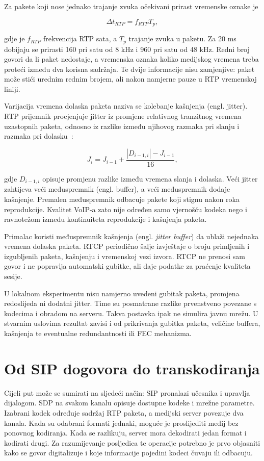 Za pakete koji nose jednako trajanje zvuka očekivani prirast vremenske oznake je

\begin{equation}
\Delta t_{RTP}=f_{RTP}T_p,
\end{equation}

gdje je $f_{RTP}$ frekvencija RTP sata, a $T_p$ trajanje zvuka u paketu. Za 20 ms dobijaju se prirasti 160 pri satu od 8 kHz i 960 pri satu od 48 kHz. Redni broj govori da li paket nedostaje, a vremenska oznaka koliko medijskog vremena treba proteći između dva korisna sadržaja. Te dvije informacije nisu zamjenjive: paket može stići urednim rednim brojem, ali nakon namjerne pauze u RTP vremenskoj liniji.

Varijacija vremena dolaska paketa naziva se kolebanje kašnjenja (engl. jitter). RTP prijemnik procjenjuje jitter iz promjene relativnog tranzitnog vremena uzastopnih paketa, odnosno iz razlike između njihovog razmaka pri slanju i razmaka pri dolasku~\cite{rfc3550}:

\begin{equation}
J_i=J_{i-1}+\frac{|D_{i-1,i}|-J_{i-1}}{16},
\end{equation}

gdje $D_{i-1,i}$ opisuje promjenu razlike između vremena slanja i dolaska. Veći jitter zahtijeva veći međuspremnik (engl. buffer), a veći međuspremnik dodaje kašnjenje. Premalen međuspremnik odbacuje pakete koji stignu nakon roka reprodukcije. Kvalitet VoIP-a zato nije određen samo vjernošću kodeka nego i ravnotežom između kontinuiteta reprodukcije i kašnjenja paketa.

Primalac koristi međuspremnik kašnjenja (engl. \emph{jitter buffer}) da ublaži nejednaka vremena dolaska paketa. RTCP periodično šalje izvještaje o broju primljenih i izgubljenih paketa, kašnjenju i vremenskoj vezi izvora. RTCP ne prenosi sam govor i ne popravlja automatski gubitke, ali daje podatke za praćenje kvaliteta sesije.

U lokalnom eksperimentu nisu namjerno uvedeni gubitak paketa, promjena redoslijeda ni dodatni jitter. Time su posmatrane razlike prvenstveno povezane s kodecima i obradom na serveru. Takva postavka ipak ne simulira javnu mrežu. U stvarnim uslovima rezultat zavisi i od prikrivanja gubitka paketa, veličine buffera, kašnjenja te eventualne redundantnosti ili FEC mehanizma.

\section{Od SIP dogovora do transkodiranja}

Cijeli put može se sumirati na sljedeći način: SIP pronalazi učesnika i upravlja dijalogom. SDP na svakom kanalu opisuje dostupne kodeke i mrežne parametre. Izabrani kodek određuje sadržaj RTP paketa, a medijski server povezuje dva kanala. Kada su odabrani formati jednaki, moguće je proslijediti medij bez ponovnog kodiranja. Kada se razlikuju, server mora dekodirati jedan format i kodirati drugi. Za razumijevanje posljedica te operacije potrebno je prvo objasniti kako se govor digitalizuje i koje informacije pojedini kodeci čuvaju ili odbacuju.
